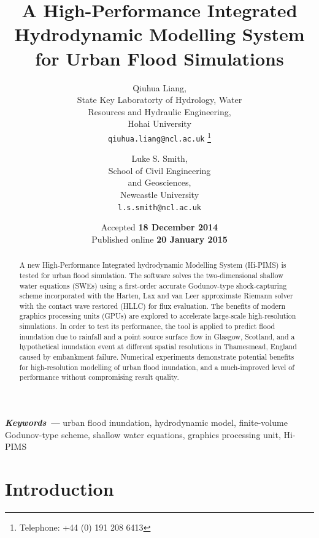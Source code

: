 \documentclass[11pt,english,a4paper]{article}
\title{A High-Performance Integrated Hydrodynamic Modelling System for Urban Flood Simulations}
\author{Qiuhua Liang,\\
	State Key Laboratorty of Hydrology, Water \\
	Resources and Hydraulic Engineering,\\
	Hohai University \\
	\texttt{qiuhua.liang@ncl.ac.uk}
	\thanks{Telephone: +44 (0) 191 208 6413}
	\and
	Luke S. Smith,\\
	School of Civil Engineering \\
	and Geosciences,\\
	Newcastle University\\
	\texttt{l.s.smith@ncl.ac.uk}
}
\date{\vspace*{12.0pt}Accepted \textbf{18 December 2014} \\ Published online \textbf{20 January 2015}}
\providecommand{\keywords}[1]{\textbf{\textit{Keywords ---}} #1}
\begin{document}
\maketitle

\begin{abstract}
A new High-Performance Integrated hydrodynamic Modelling System (Hi-PIMS) is tested for urban flood simulation. The software solves the two-dimensional shallow water equations (SWEs) using a first-order accurate Godunov-type shock-capturing scheme incorporated with the Harten, Lax and van Leer approximate Riemann solver with the contact wave restored (HLLC) for flux evaluation. The benefits of modern graphics processing units (GPUs) are explored to accelerate large-scale high-resolution simulations. In order to test its performance, the tool is applied to predict flood inundation due to rainfall and a point source surface flow in Glasgow, Scotland, and a hypothetical inundation event at different spatial resolutions in Thamesmead, England caused by embankment failure. Numerical experiments demonstrate potential benefits for high-resolution modelling of urban flood inundation, and a much-improved level of performance without compromising result quality.
\end{abstract}
\keywords{urban flood inundation, hydrodynamic model, finite-volume Godunov-type scheme, shallow water equations, graphics processing unit, Hi-PIMS}

\vfill
\noindent{}

\section{Introduction}
\end{document}
